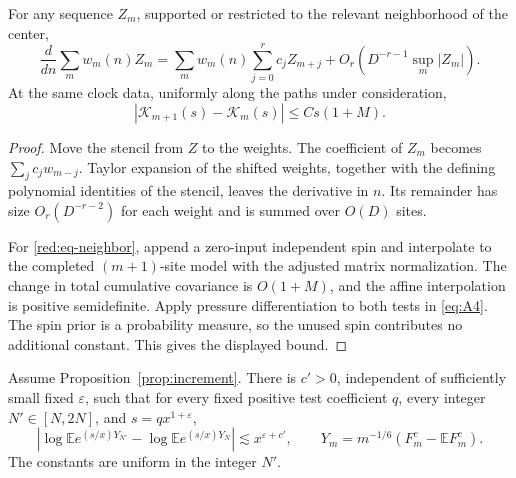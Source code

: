 \begin{lemma}\label{red:lem-site-smoothing}
For any sequence \(Z_m\), supported or restricted to the relevant
neighborhood of the center,
\[
 \frac{d}{dn}\sum_m w_m(n)Z_m
 =\sum_m w_m(n)\sum_{j=0}^r c_j Z_{m+j}
       +O_r\!\left(D^{-r-1}\sup_m|Z_m|\right).
\]
At the same clock data, uniformly along the paths under consideration,
\begin{equation}\label{red:eq-neighbor}
 |\mathcal K_{m+1}(s)-\mathcal K_m(s)|\le Cs(1+M).
\end{equation}
\end{lemma}

\begin{proof}
Move the stencil from \(Z\) to the weights. The coefficient of
\(Z_m\) becomes \(\sum_jc_jw_{m-j}\). Taylor expansion of the shifted
weights, together with the defining polynomial identities of the
stencil, leaves the derivative in \(n\). Its remainder has size
\(O_r(D^{-r-2})\) for each weight and is summed over \(O(D)\) sites.

For \eqref{red:eq-neighbor}, append a zero-input independent spin and
interpolate to the completed \((m+1)\)-site model with the adjusted
matrix normalization. The change in total cumulative covariance is
\(O(1+M)\), and the affine interpolation is positive semidefinite.
Apply pressure differentiation to both tests in \eqref{eq:A4}.
The spin prior is a probability measure, so the unused spin contributes
no additional constant. This gives the displayed bound.
\end{proof}

\begin{proposition}\label{red:prop-dyadic}
Assume Proposition~\ref{prop:increment}. There is \(c'>0\), independent
of sufficiently small fixed \(\varepsilon\), such that for every fixed
positive test coefficient \(q\), every integer \(N'\in[N,2N]\), and
\(s=q x^{1+\varepsilon}\),
\[
 \left|\log\mathbb E e^{(s/x)Y_{N'}}
       -\log\mathbb E e^{(s/x)Y_N}\right|
 \lesssim x^{\varepsilon+c'},\qquad
 Y_m=m^{-1/6}(F_m^c-\mathbb EF_m^c).
\]
The constants are uniform in the integer \(N'\).
\end{proposition}

